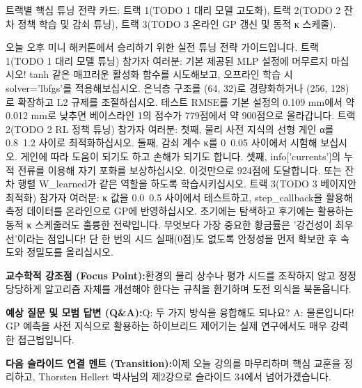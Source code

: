 \documentclass[11pt,a4paper]{article}
\begin{document}
\vspace{0.2em}
\begin{tcolorbox}[colback=lightbg,colframe=bordergray,title={\footnotesize\bfseries\color{darkgray}슬라이드 시각 구성 요약},fontupper=\small,left=6pt,right=6pt,top=2.5pt,bottom=2.5pt,boxrule=0.6pt,arc=2.5pt]
트랙별 핵심 튜닝 전략 카드: 트랙 1(TODO 1 대리 모델 고도화), 트랙 2(TODO 2 잔차 정책 학습 및 감쇠 튜닝), 트랙 3(TODO 3 온라인 GP 갱신 및 동적 κ 스케줄).
\end{tcolorbox}
\vspace{0.2em}
\begin{tcolorbox}[colback=white,colframe=primaryblue,title={\footnotesize\bfseries\color{white}발표자 구두 대본 (Spoken Script)},fontupper=\small,left=6pt,right=6pt,top=3pt,bottom=3pt,boxrule=0.8pt,arc=2.5pt]
오늘 오후 미니 해커톤에서 승리하기 위한 실전 튜닝 전략 가이드입니다. 트랙 1(TODO 1 대리 모델 튜닝) 참가자 여러분: 기본 제공된 MLP 설정에 머무르지 마십시오! tanh 같은 매끄러운 활성화 함수를 시도해보고, 오프라인 학습 시 solver='lbfgs'를 적용해보십시오. 은닉층 구조를 (64, 32)로 경량화하거나 (256, 128)로 확장하고 L2 규제를 조절하십시오. 테스트 RMSE를 기본 설정의 0.109 mm에서 약 0.012 mm로 낮추면 베이스라인 1의 점수가 779점에서 약 900점으로 올라갑니다. 트랙 2(TODO 2 RL 정책 튜닝) 참가자 여러분: 첫째, 물리 사전 지식의 선형 게인 α를 0.8~1.2 사이로 최적화하십시오. 둘째, 감쇠 계수 κ를 0~0.05 사이에서 시험해 보십시오. 게인에 따라 도움이 되기도 하고 손해가 되기도 합니다. 셋째, info['currents']의 누적 전류를 이용해 자기 포화를 보상하십시오. 이것만으로 924점에 도달합니다. 또는 잔차 행렬 W\_learned가 같은 역할을 하도록 학습시키십시오. 트랙 3(TODO 3 베이지안 최적화) 참가자 여러분: κ 값을 0.0~0.5 사이에서 테스트하고, step\_callback을 활용해 측정 데이터를 온라인으로 GP에 반영하십시오. 초기에는 탐색하고 후기에는 활용하는 동적 κ 스케줄러도 훌륭한 전략입니다. 무엇보다 가장 중요한 황금률은 '강건성이 최우선'이라는 점입니다! 단 한 번의 시드 실패(0점)도 없도록 안정성을 먼저 확보한 후 속도와 정밀도를 올리십시오.
\end{tcolorbox}
\vspace{0.2em}
\begin{tcolorbox}[colback=lightbg,colframe=bordergray,left=6pt,right=6pt,top=3pt,bottom=3pt,boxrule=0.6pt,arc=2.5pt]
\small
\noindent\textbf{\color{navy}교수학적 강조점 (Focus Point):}\enspace 환경의 물리 상수나 평가 시드를 조작하지 않고 정정당당하게 알고리즘 자체를 개선해야 한다는 규칙을 환기하며 도전 의식을 북돋웁니다.\par\vspace{0.3em}
\noindent\textbf{\color{successgreen}예상 질문 및 모범 답변 (Q\&A):}\enspace Q: 두 가지 방식을 융합해도 되나요? A: 물론입니다! GP 예측을 사전 지식으로 활용하는 하이브리드 제어기는 실제 연구에서도 매우 강력한 접근법입니다.\par\vspace{0.3em}
\noindent\textbf{\color{accent}다음 슬라이드 연결 멘트 (Transition):}\enspace 이제 오늘 강의를 마무리하며 핵심 교훈을 정리하고, Thorsten Hellert 박사님의 제2강으로 슬라이드 34에서 넘어가겠습니다.
\end{tcolorbox}
\end{document}
